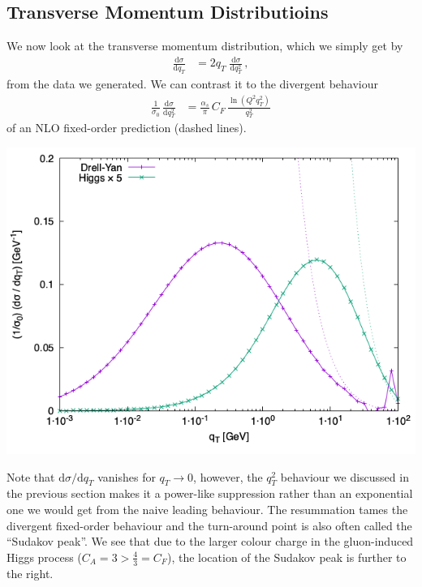 \documentclass[11pt]{article}
\begin{document}
\subsection{Transverse Momentum Distributioins}
\label{sec:org713124f}
We now look at the transverse momentum distribution, which we simply get by
\begin{align}
  \frac{\mathrm{d}\sigma}{\mathrm{d}q_T}
  &=
  2 q_T \; \frac{\mathrm{d}\sigma}{\mathrm{d}q_T^2}
  \,,
\end{align}
from the data we generated.
We can contrast it to the divergent behaviour
\begin{align}
  \frac{1}{\sigma_0}\,\frac{\mathrm{d}\sigma}{\mathrm{d}q_T^2}
  &=
  \frac{\alpha_s}{\pi}\, C_F \, \frac{\ln(Q^2 q_T^2)}{q_T^2}
\end{align}
of an NLO fixed-order prediction (dashed lines).
\begin{center}
\includegraphics[width=.9\linewidth]{plot_dy.png}
\end{center}
Note that \(\mathrm{d}\sigma/\mathrm{d}q_T\) vanishes for \(q_T\to0\), however, the \(q_T^2\) behaviour we discussed in the previous section makes it a power-like suppression rather than an exponential one we would get from the naive leading behaviour.
The resummation tames the divergent fixed-order behaviour and the turn-around point is also often called the ``Sudakov peak''.
We see that due to the larger colour charge in the gluon-induced Higgs process (\(C_A = 3 > \tfrac{4}{3} = C_F\)), the location of the Sudakov peak is further to the right.
\end{document}
